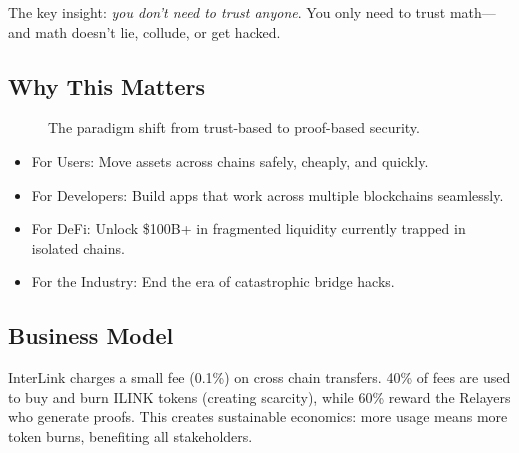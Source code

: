 \documentclass[11pt,a4paper]{article}
\begin{document}
The key insight: \textit{you don't need to trust anyone}. You only need to trust math---and math doesn't lie, collude, or get hacked.

\subsection*{Why This Matters}

\begin{figure}[H]
\centering
{}
\caption{The paradigm shift from trust-based to proof-based security.}
\end{figure}

\begin{itemize}
    \item For Users: Move assets across chains safely, cheaply, and quickly.
    \item For Developers: Build apps that work across multiple blockchains seamlessly.
    \item For DeFi: Unlock \$100B+ in fragmented liquidity currently trapped in isolated chains.
    \item For the Industry: End the era of catastrophic bridge hacks.
\end{itemize}

\subsection*{Business Model}

InterLink charges a small fee (0.1\%) on cross chain transfers. 40\% of fees are used to buy and burn ILINK tokens (creating scarcity), while 60\% reward the Relayers who generate proofs. This creates sustainable economics: more usage means more token burns, benefiting all stakeholders.
\end{document}
